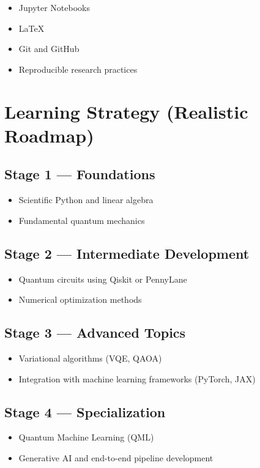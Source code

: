 \documentclass[a4paper,12pt]{book}
\begin{document}
\begin{itemize}
    \item Jupyter Notebooks
    \item LaTeX
    \item Git and GitHub
    \item Reproducible research practices
\end{itemize}

\section*{Learning Strategy (Realistic Roadmap)}

\subsection*{Stage 1 — Foundations}
\begin{itemize}
    \item Scientific Python and linear algebra
    \item Fundamental quantum mechanics
\end{itemize}

\subsection*{Stage 2 — Intermediate Development}
\begin{itemize}
    \item Quantum circuits using Qiskit or PennyLane
    \item Numerical optimization methods
\end{itemize}

\subsection*{Stage 3 — Advanced Topics}
\begin{itemize}
    \item Variational algorithms (VQE, QAOA)
    \item Integration with machine learning frameworks (PyTorch, JAX)
\end{itemize}

\subsection*{Stage 4 — Specialization}
\begin{itemize}
    \item Quantum Machine Learning (QML)
    \item Generative AI and end-to-end pipeline development
\end{itemize}
\end{document}
